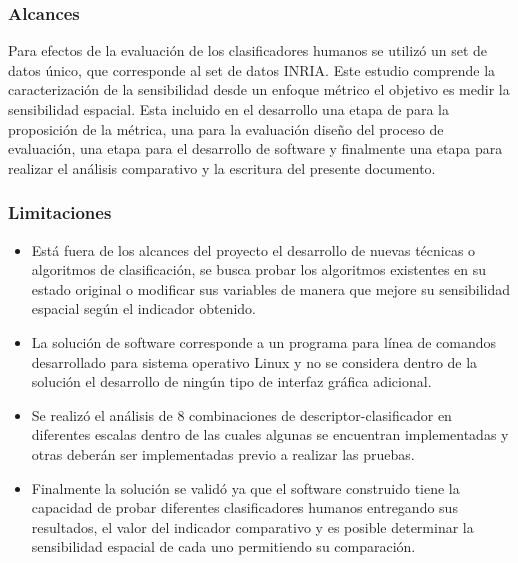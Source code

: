 \subsubsection{Alcances}

Para efectos de la evaluación de los clasificadores humanos se utilizó un set de datos único, que corresponde al set de datos INRIA. Este estudio comprende la caracterización de la sensibilidad desde un enfoque métrico \ie el objetivo es medir la sensibilidad espacial. Esta incluido en el desarrollo una etapa de para la proposición de la métrica, una para la evaluación diseño del proceso de evaluación, una etapa para el desarrollo de software y finalmente una etapa para realizar el análisis comparativo y la escritura del presente documento.

\subsubsection{Limitaciones}

\begin{itemize}

\item Está fuera de los alcances del proyecto el desarrollo de nuevas técnicas o algoritmos de clasificación, se busca probar los algoritmos existentes en su estado original o modificar sus variables de manera que mejore su sensibilidad espacial según el indicador obtenido.

\item La solución de software corresponde a un programa para línea de comandos desarrollado para sistema operativo Linux y no se considera dentro de la solución el desarrollo de ningún tipo de interfaz gráfica adicional.

\item Se realizó el análisis de 8 combinaciones de descriptor-clasificador en diferentes escalas dentro de las cuales algunas se encuentran implementadas y otras deberán ser implementadas previo a realizar las pruebas.

\item Finalmente la solución se validó ya que el software construido tiene la capacidad de probar diferentes clasificadores humanos entregando sus resultados, el valor del indicador comparativo y es posible determinar la sensibilidad espacial de cada uno permitiendo su comparación.

\end{itemize}


